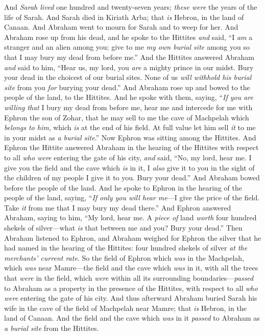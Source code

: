 \begin{biblechapter} %
 And \textit{Sarah lived} one hundred and twenty-seven years; \textit{these were} the years of the life of Sarah.
\verse And Sarah died in Kiriath Arba; that \textit{is} Hebron, in the land of Canaan.
\verse And Abraham went to mourn for Sarah and to weep for her. And Abraham rose up from his dead, and he spoke to the Hittites \textit{and} said,
\verse “I \textit{am} a stranger and an alien among you; give to me \textit{my own burial site} among you so that I may bury my dead from before me.”
\verse And the Hittites answered Abraham \textit{and} said to him,
\verse “Hear us, my lord, you \textit{are} a mighty prince in our midst. Bury your dead in the choicest of our burial sites. None of us \textit{will withhold his burial site} from you \textit{for} burying your dead.”
\verse And Abraham rose up and bowed to the people of the land, to the Hittites.
\verse And he spoke with them, saying, “\textit{If you are willing} \textit{that} I bury my dead from before me, hear me and intercede for me with Ephron the son of Zohar,
\verse that he may sell to me the cave of Machpelah which \textit{belongs to him}, which \textit{is} at the end of his field. At full value let him sell \textit{it} to me in your midst as \textit{a burial site}.”
\verse Now Ephron was sitting among the Hittites. And Ephron the Hittite answered Abraham in the hearing of the Hittites with respect to all \textit{who were} entering the gate of his city, \textit{and} said,
\verse “No, my lord, hear me. I give you the field and the cave which \textit{is} in it, I \textit{also} give it to you in the sight of the children of my people I give it to you. Bury your dead.”
\verse And Abraham bowed before the people of the land.
\verse And he spoke to Ephron in the hearing of the people of the land, saying, “\textit{If only you will hear me}—I give the price of the field. Take \textit{it} from me that I may bury my dead there.”
\verse And Ephron answered Abraham, saying to him,
\verse “My lord, hear me. A \textit{piece of} land \textit{worth} four hundred shekels of silver—what \textit{is} that between me and you? Bury your dead.”
\verse Then Abraham listened to Ephron, and Abraham weighed for Ephron the silver that he had named in the hearing of the Hittites: four hundred shekels of silver \textit{at the merchants’ current rate}.
\verse So the field of Ephron which \textit{was} in the Machpelah, which \textit{was} near Mamre—the field and the cave which \textit{was} in it, with all the trees that \textit{were} in the field, which \textit{were} within all its surrounding boundaries—\textit{passed}
\verse to Abraham as a property in the presence of the Hittites, with respect to all \textit{who were} entering the gate of his city.
\verse And thus afterward Abraham buried Sarah his wife in the cave of the field of Machpelah near Mamre; that \textit{is} Hebron, in the land of Canaan.
\verse And the field and the cave which \textit{was} in it \textit{passed} to Abraham as \textit{a burial site} from the Hittites.
\end{biblechapter}

